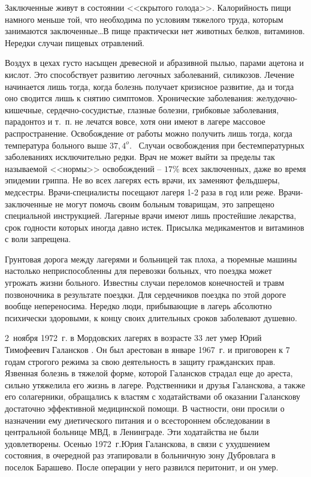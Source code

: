 \documentclass{book}
\begin{document}
Заключенные живут в состоянии <<скрытого голода>>. Калорийность пищи намного меньше той, что необходима по усло­виям тяжелого труда, которым занимаются заключенные\ldots В пище практически нет животных белков, витаминов. Нередки случаи пищевых отравлений.

Воздух в цехах густо насыщен древесной и абразивной пылью, парами ацетона и кислот. Это способствует развитию легочных заболеваний, силикозов. Лечение начинается лишь тогда, когда болезнь получает кризисное развитие, да и тогда оно сводится лишь к снятию симптомов. Хронические заболевания: желудочно-кишечные, сердечно-сосудистые, глазные болезни, грибковые заболевания, парадонтоз и т.~п. не лечатся вовсе, хотя они имеют в лагере массовое распространение. Освобождение от работы можно получить лишь тогда, когда температура больного выше $37,4^{o}$.  Случаи освобождения при бестемпературных заболеваниях исключительно редки. Врач не может выйти за пределы так называемой <<нормы>> освобождений -- $17\%$ всех заключенных, даже во время эпидемии гриппа. Не во всех лагерях есть врачи, их заменяют фельдшеры, медсестры. Врачи-специалисты посещают лагеря 1-2 раза в год или реже. Врачи-заключенные не могут помочь своим больным товарищам, это запрещено специальной инструкцией. Лагерные врачи имеют лишь простейшие лекарства, срок годности кото­рых иногда давно истек. Присылка медикаментов и витаминов с воли запрещена.

Грунтовая дорога между лагерями и больницей так плоха, а тюремные машины настолько неприспособленны для перевозки больных, что поездка может угрожать жизни больного. Известны случаи переломов конечностей и травм позвоночника в результате поездки. Для сердечников поездка по этой дороге вообще непереносима. Нередко люди, прибывающие в лагерь абсолютно психически здоровыми, к концу своих длительных сроков заболевают душевно.

2~ноября 1972~г. в Мордовских лагерях в возрасте 33 лет умер Юрий Тимофеевич Галансков%
.
Он был арестован в январе 1967~г. и приговорен к 7 годам строгого режима за свою деятельность в защиту гражданских прав. Язвенная болезнь в тяжелой форме, которой Галансков страдал еще до ареста, сильно утяжелила его жизнь в лагере. Родственники и друзья Галанскова, а также его солагерники, обращались к властям с ходатайствами об оказании Галанскову достаточно эффективной медицинской помощи. В частности, они просили о назначении ему диетического питания и о всестороннем обследова­нии в центральной больнице МВД, в Ленинграде. Эти ходатайства не были удовлетворены. Осенью 1972~г.Юрия Галанскова, в связи с ухудшением состояния, в очередной раз этапировали в больничную зону Дубровлага в поселок Барашево. После операции у него развился перитонит, и он умер.
\end{document}
